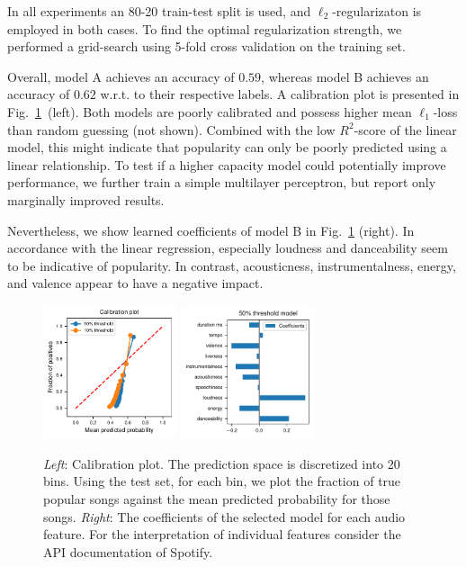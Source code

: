\documentclass{article}
\begin{document}
In all experiments an 80-20 train-test split is used, and $\ell_2$-regularizaton is employed in both cases. To find the optimal regularization strength, we performed a grid-search using 5-fold cross validation on the training set.

Overall, model A achieves an accuracy of $0.59$, whereas model B achieves an accuracy of $0.62$ w.r.t. to their respective labels.
A calibration plot is presented in Fig.~\ref{fig:logis_eval}~(left). 
Both models are poorly calibrated and possess higher mean $\ell_1$-loss than random guessing (not shown). Combined with the low $R^2$-score of the linear model, this might indicate that popularity can only be poorly predicted using a linear relationship. To test if a higher capacity model could potentially improve performance, we further train a simple multilayer perceptron, but report only marginally improved results.

Nevertheless, we show learned coefficients of model B in Fig.~\ref{fig:logis_eval} (right). In accordance with the linear regression, especially loudness and danceability seem to be indicative of popularity. In contrast, acousticness, instrumentalness, energy, and valence appear to have a negative impact.

\begin{figure}
  \centering
  \includegraphics[width=0.35\textwidth]{../figures/calibration_combined.pdf}
  \qquad
  \includegraphics[width=0.35\textwidth]{../figures/logistic_coefs_50_threshold_model.pdf}
  \caption{\textit{Left}: Calibration plot. The prediction space is discretized into \num{20} bins. Using the test set, for each bin, we plot the fraction of true popular songs against the mean predicted probability for those songs. \textit{Right}: The coefficients of the selected model for each audio feature. For the interpretation of individual features consider the API documentation of Spotify.}
  \label{fig:logis_eval}
\end{figure}
  
\end{document}

